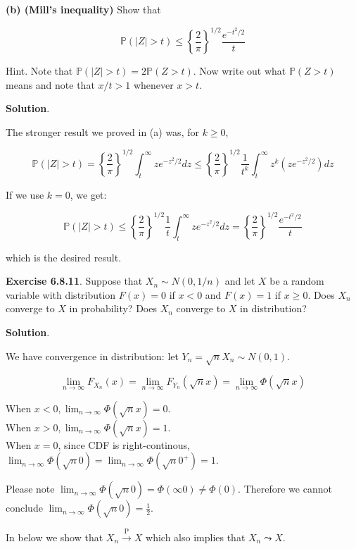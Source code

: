 \textbf{(b) (Mill's inequality)} Show that

\[\mathbb{P}(|Z| > t) \leq \left\{ \frac{2}{\pi} \right\}^{1/2} \frac{e^{-t^2/2}}{t}\]

Hint. Note that \(\mathbb{P}(|Z| > t) = 2\mathbb{P}(Z > t)\). Now write
out what \(\mathbb{P}(Z > t)\) means and note that \(x/t > 1\) whenever
\(x > t\).

\textbf{Solution}.

The stronger result we proved in (a) was, for \(k \geq 0\),

\[
\mathbb{P}(|Z| > t) = \left\{ \frac{2}{\pi} \right\}^{1/2}  \int _t^{\infty} z e^{-z^2/2} dz \leq \left\{ \frac{2}{\pi} \right\}^{1/2} \frac{1}{t^k}\int _{t}^{\infty} z^k \left( z e^{-z^2/2} \right) dz
\]

If we use \(k = 0\), we get:

\[
\mathbb{P}(|Z| > t) \leq \left\{ \frac{2}{\pi} \right\}^{1/2} \frac{1}{t}\int _{t}^{\infty} z e^{-z^2/2} dz = \left\{ \frac{2}{\pi} \right\}^{1/2} \frac{e^{-t^2/2}}{t}
\]

which is the desired result.

\textbf{Exercise 6.8.11}. Suppose that \(X_n \sim N(0, 1/n)\) and let
\(X\) be a random variable with distribution \(F(x) = 0\) if \(x < 0\)
and \(F(x) = 1\) if \(x \geq 0\). Does \(X_n\) converge to \(X\) in
probability? Does \(X_n\) converge to \(X\) in distribution?

\textbf{Solution}.

We have convergence in distribution: let
\(Y_n = \sqrt{n}X_n \sim N(0,1)\).

\[ \lim_{n \rightarrow \infty} F_{X_n}(x) = \lim_{n \rightarrow \infty} F_{Y_n} (\sqrt{n}x) = \lim_{n \rightarrow \infty} \Phi(\sqrt{n}x) \]

When \(x < 0, \lim_{n \rightarrow \infty} \Phi(\sqrt{n}x) = 0\).\\
When \(x > 0, \lim_{n \rightarrow \infty} \Phi(\sqrt{n}x) = 1\).\\
When \(x = 0\), since CDF is right-continous,
\(\lim_{n \rightarrow \infty} \Phi(\sqrt{n}0)=\lim_{n \rightarrow \infty} \Phi(\sqrt{n}0^+) = 1\).

Please note
\(\lim_{n \rightarrow \infty} \Phi(\sqrt{n}0) =  \Phi(\infty 0) \neq \Phi(0)\).
Therefore we cannot conclude
\(\lim_{n \rightarrow \infty} \Phi(\sqrt{n}0) = \frac{1}{2}\).

In below we show that \(X_n \xrightarrow{\text{P}} X\) which also
implies that \(X_n \leadsto X\).

